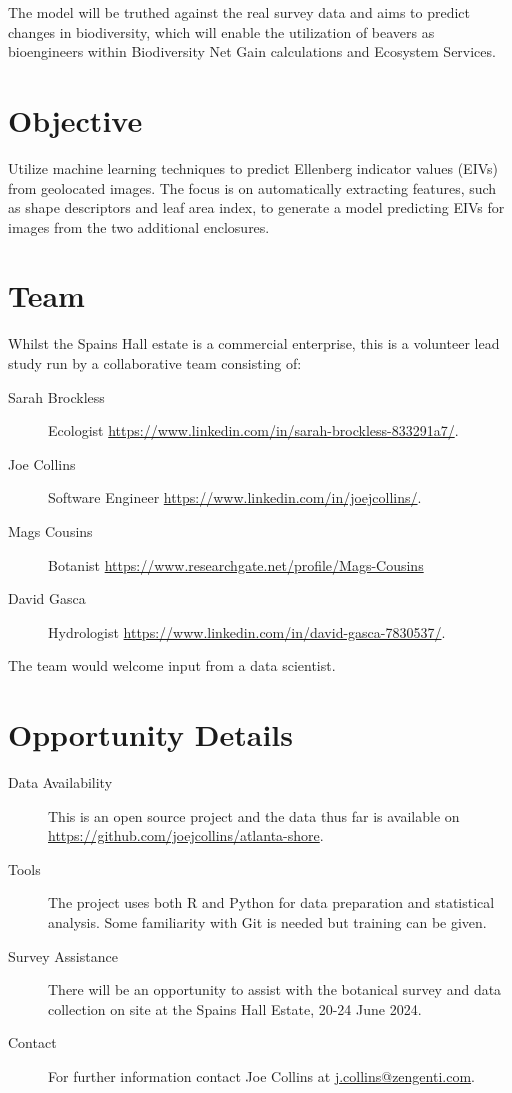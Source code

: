 \documentclass{roles}
\begin{document}
The model will be truthed against the real survey data and aims to predict changes in biodiversity,
which will enable the utilization of beavers as bioengineers within Biodiversity Net Gain calculations and Ecosystem Services. 

\section*{Objective}

Utilize machine learning techniques to predict Ellenberg indicator values (EIVs)
from geolocated images.
The focus is on automatically extracting features,
such as shape descriptors and leaf area index,
to generate a model predicting EIVs for images from the two additional enclosures.

\section*{Team}

Whilst the Spains Hall estate is a commercial enterprise,
this is a volunteer lead study
run by a collaborative team consisting of:

\begin{description}
    \item[Sarah Brockless] Ecologist \href{https://www.linkedin.com/in/sarah-brockless-833291a7/}{https://www.linkedin.com/in/sarah-brockless-833291a7/}.
    \item[Joe Collins] Software Engineer \href{https://www.linkedin.com/in/joejcollins/}{https://www.linkedin.com/in/joejcollins/}.
    \item[Mags Cousins] Botanist \href{https://www.researchgate.net/profile/Mags-Cousins}{https://www.researchgate.net/profile/Mags-Cousins}
    \item[David Gasca] Hydrologist \href{https://www.linkedin.com/in/david-gasca-7830537/}{https://www.linkedin.com/in/david-gasca-7830537/}.
\end{description}

The team would welcome input from a data scientist.

\section*{Opportunity Details}

\begin{description}
    \item[Data Availability] This is an open source project and
        the data thus far is available on \href{https://github.com/joejcollins/atlanta-shore}{https://github.com/joejcollins/atlanta-shore}.
    \item[Tools] The project uses both R and Python for data preparation and statistical analysis.
        Some familiarity with Git is needed but training can be given.
    \item[Survey Assistance] There will be an opportunity to assist with the botanical survey
        and data collection on site at the Spains Hall Estate, 20-24 June 2024.
    \item[Contact] For further information contact Joe Collins at \href{mailto:j.collins@zengenti.com}{j.collins@zengenti.com}.
\end{description}
\end{document}

